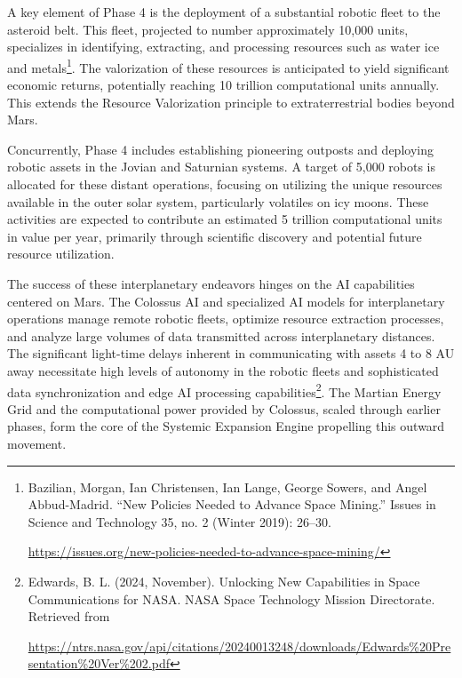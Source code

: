 \documentclass[fontsize=10pt, oneside, DIV=calc]{scrartcl}
\begin{document}
\medskip

\noindent
A key element of Phase 4 is the deployment of a substantial robotic fleet to the asteroid belt. This fleet, projected to number approximately 10,000 units, specializes in identifying, extracting, and processing resources such as water ice and metals\footnote{Bazilian, Morgan, Ian Christensen, Ian Lange, George Sowers, and Angel Abbud-Madrid. ``New Policies Needed to Advance Space Mining.'' Issues in Science and Technology 35, no. 2 (Winter 2019): 26--30. 







\href{https://issues.org/new-policies-needed-to-advance-space-mining/}\url{https://issues.org/new-policies-needed-to-advance-space-mining/}}. The valorization of these resources is anticipated to yield significant economic returns, potentially reaching 10 trillion computational units annually. This extends the Resource Valorization principle to extraterrestrial bodies beyond Mars.

\medskip

\noindent
Concurrently, Phase 4 includes establishing pioneering outposts and deploying robotic assets in the Jovian and Saturnian systems. A target of 5,000 robots is allocated for these distant operations, focusing on utilizing the unique resources available in the outer solar system, particularly volatiles on icy moons. These activities are expected to contribute an estimated 5 trillion computational units in value per year, primarily through scientific discovery and potential future resource utilization.

\medskip

\noindent
The success of these interplanetary endeavors hinges on the AI capabilities centered on Mars. The Colossus AI and specialized AI models for interplanetary operations manage remote robotic fleets, optimize resource extraction processes, and analyze large volumes of data transmitted across interplanetary distances. The significant light-time delays inherent in communicating with assets 4 to 8 AU away necessitate high levels of autonomy in the robotic fleets and sophisticated data synchronization and edge AI processing capabilities\footnote{Edwards, B. L. (2024, November). Unlocking New Capabilities in Space Communications for NASA. NASA Space Technology Mission Directorate. Retrieved from 







\href{https://ntrs.nasa.gov/api/citations/20240013248/downloads/Edwards\%20Presentation\_Ver\%202.pdf}\url{https://ntrs.nasa.gov/api/citations/20240013248/downloads/Edwards\%20Presentation\%20Ver\%202.pdf}}. The Martian Energy Grid and the computational power provided by Colossus, scaled through earlier phases, form the core of the Systemic Expansion Engine propelling this outward movement.
\end{document}

